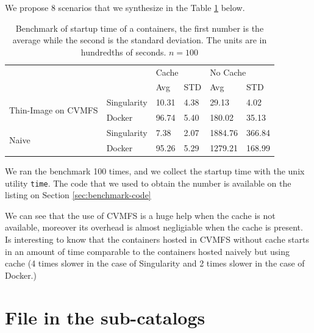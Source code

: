 We propose 8 scenarios that we synthesize in the Table \ref{tab:benchmark}
below.


\begin{table}[]
\begin{tabular}{|l|l|l|l|l|l|}
\hline
\multicolumn{2}{|l|}{\multirow{2}{*}{}}            & \multicolumn{2}{l|}{Cache} & \multicolumn{2}{l|}{No Cache} \\ \cline{3-6} 
\multicolumn{2}{|l|}{}                             & Avg          & STD         & Avg            & STD          \\ \hline \hline
\multirow{2}{*}{Thin-Image on CVMFS} & Singularity & 10.31        & 4.38        & 29.13          & 4.02         \\ \cline{2-6} 
                                     & Docker      & 96.74        & 5.40        & 180.02         & 35.13        \\ \hline \hline
\multirow{2}{*}{Naive}               & Singularity & 7.38         & 2.07        & 1884.76        & 366.84       \\ \cline{2-6} 
                                     & Docker      & 95.26        & 5.29        & 1279.21        & 168.99       \\ \hline
\end{tabular}
\caption{Benchmark of startup time of a containers, the first number is the average while the second is the standard deviation. The units are in hundredths of seconds. $n = 100$}
\label{tab:benchmark}
\end{table}

We ran the benchmark 100 times, and we collect the startup time with the unix
utility \texttt{time}. The code that we used to obtain the number is available
on the listing on Section \ref{sec:benchmark-code}

We can see that the use of CVMFS is a huge help when the cache is not
available, moreover its overhead is almost negligiable when the cache is
present. Is interesting to know that the containers hosted in CVMFS without
cache starts in an amount of time comparable to the containers hosted naively
but using cache (4 times slower in the case of Singularity and 2 times slower
in the case of Docker.)

\section{File in the sub-catalogs}

